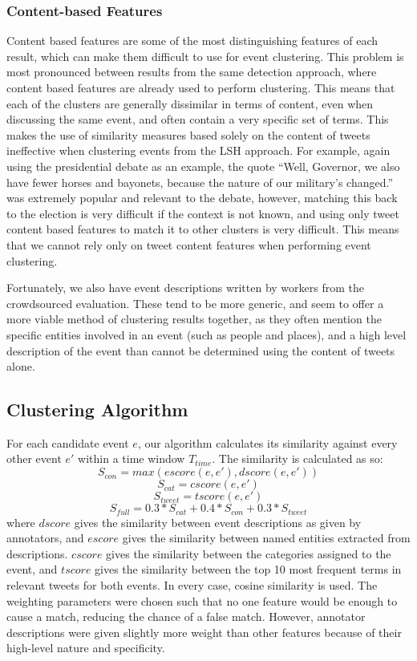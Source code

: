 \subsubsection{Content-based Features}
Content based features are some of the most distinguishing features of each result, which can make them difficult to use for event clustering.
This problem is most pronounced between results from the same detection approach, where content based features are already used to perform clustering.
This means that each of the clusters are generally dissimilar in terms of content, even when discussing the same event, and often contain a very specific set of terms.
This makes the use of similarity measures based solely on the content of tweets  ineffective when clustering events from the LSH approach.
For example, again using the presidential debate as an example, the quote ``Well, Governor, we also have fewer horses and bayonets, because the nature of our military's changed.'' was extremely popular and relevant to the debate, however, matching this back to the election is very difficult if the context is not known, and using only tweet content based features to match it to other clusters is very difficult.
This means that we cannot rely only on tweet content features when performing event clustering.

Fortunately, we also have event descriptions written by workers from the crowdsourced evaluation.
These tend to be more generic, and seem to offer a more viable method of clustering results together, as they often mention the specific entities involved in an event (such as people and places), and a high level description of the event than cannot be determined using the content of tweets alone.

\subsection{Clustering Algorithm}
\label{sec:clusteringalg}
For each candidate event \(e\), our algorithm calculates its similarity against every other event \(e'\) within a time window \(T_{time}\). The similarity is calculated as so:
\[
S_{con} = max(escore(e, e'), dscore(e, e'))
\]
\[
S_{cat} = cscore(e, e')
\]
\[
S_{tweet} = tscore(e, e')
\]
\[
S_{full} = 0.3 * S_{cat} + 0.4 * S_{con} + 0.3 * S_{tweet}
\]
where \(dscore\) gives the similarity between event descriptions as given by annotators, and \(escore\) gives the similarity between named entities extracted from descriptions. \(cscore\) gives the similarity between the categories assigned to the event, and \(tscore\) gives the similarity between the top 10 most frequent terms in relevant tweets for both events.
In every case, cosine similarity is used.
The weighting parameters were chosen such that no one feature would be enough to cause a match, reducing the chance of a false match.
However, annotator descriptions were given slightly more weight than other features because of their high-level nature and specificity.

